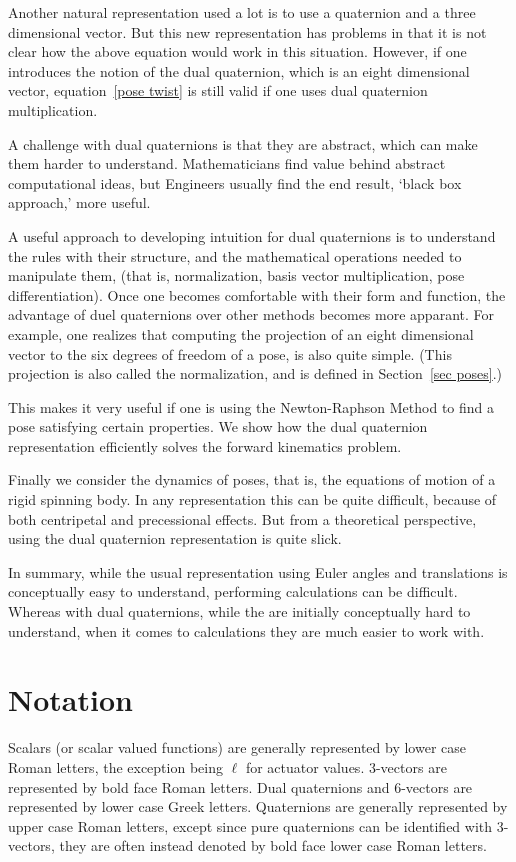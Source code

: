 \documentclass[reqno,12pt]{amsart}
\begin{document}
Another natural representation used a lot is to use a quaternion and a three dimensional vector.  But this new representation has problems in that it is not clear how the above equation would work in this situation.  However, if one introduces the notion of the dual quaternion, which is an eight dimensional vector, equation~\eqref{pose twist} is still valid if one uses dual quaternion multiplication.

A challenge with dual quaternions is that they are abstract, which can make them harder to understand.  Mathematicians find value behind abstract computational ideas, but Engineers usually find the end result, `black box approach,' more useful.

A useful approach to developing intuition for dual quaternions is to understand the rules with their structure, and the mathematical operations needed to manipulate them, (that is, normalization, basis vector multiplication, pose differentiation).  Once one becomes comfortable with their form and function, the advantage of duel quaternions over other methods becomes more apparant.  For example, one realizes that computing the projection of an eight dimensional vector to the six degrees of freedom of a pose, is also quite simple.  (This projection is also called the normalization, and is defined in Section~\ref{sec poses}.)

This makes it very useful if one is using the Newton-Raphson Method to find a pose satisfying certain properties.  We show how the dual quaternion representation efficiently solves the forward kinematics problem.

Finally we consider the dynamics of poses, that is, the equations of motion of a rigid spinning body.  In any representation this can be quite difficult, because of both centripetal and precessional effects.  But from a theoretical perspective, using the dual quaternion representation is quite slick.

In summary, while the usual representation using Euler angles and translations is conceptually easy to understand, performing calculations can be difficult.  Whereas with dual quaternions, while the are initially conceptually hard to understand, when it comes to calculations they are much easier to work with.

\section{Notation}

Scalars (or scalar valued functions) are generally represented by lower case Roman letters, the exception being $\ell$ for actuator values.  3-vectors are represented by bold face Roman letters.  Dual quaternions and 6-vectors are represented by lower case Greek letters.  Quaternions are generally represented by upper case Roman letters, except since pure quaternions can be identified with 3-vectors, they are often instead denoted by bold face lower case Roman letters.
\end{document}
